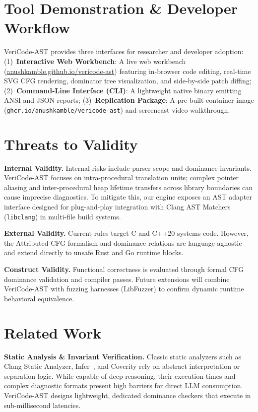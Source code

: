 \documentclass[sigconf,screen,nonacm,pbalance]{acmart}
\begin{document}
\section{Tool Demonstration \& Developer Workflow}
\label{sec:demo}

VeriCode-AST provides three interfaces for researcher and developer adoption: (1)~\textbf{Interactive Web Workbench}: A live web workbench (\href{https://anushkamble.github.io/vericode-ast/}{anushkamble.github.io/vericode-ast}) featuring in-browser code editing, real-time SVG CFG rendering, dominator tree visualization, and side-by-side patch diffing; (2)~\textbf{Command-Line Interface (CLI)}: A lightweight native binary emitting ANSI and JSON reports; (3)~\textbf{Replication Package}: A pre-built container image (\texttt{ghcr.io/anushkamble/vericode-ast}) and screencast video walkthrough.

\section{Threats to Validity}
\label{sec:threats}

\noindent\textbf{Internal Validity.} Internal risks include parser scope and dominance invariants. VeriCode-AST focuses on intra-procedural translation units; complex pointer aliasing and inter-procedural heap lifetime transfers across library boundaries can cause imprecise diagnostics. To mitigate this, our engine exposes an AST adapter interface designed for plug-and-play integration with Clang AST Matchers (\texttt{libclang}) in multi-file build systems.

\noindent\textbf{External Validity.} Current rules target C and C++20 systems code. However, the Attributed CFG formalism and dominance relations are language-agnostic and extend directly to unsafe Rust and Go runtime blocks.

\noindent\textbf{Construct Validity.} Functional correctness is evaluated through formal CFG dominance validation and compiler passes. Future extensions will combine VeriCode-AST with fuzzing harnesses (LibFuzzer) to confirm dynamic runtime behavioral equivalence.

\section{Related Work}
\label{sec:related}

\noindent\textbf{Static Analysis \& Invariant Verification.} Classic static analyzers such as Clang Static Analyzer, Infer~\cite{calcagno2015moving}, and Coverity rely on abstract interpretation or separation logic. While capable of deep reasoning, their execution times and complex diagnostic formats present high barriers for direct LLM consumption. VeriCode-AST designs lightweight, dedicated dominance checkers that execute in sub-millisecond latencies.
\end{document}
